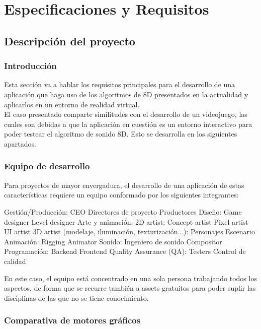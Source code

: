 \section{Especificaciones y Requisitos}

\subsection{Descripción del proyecto}
\subsubsection{Introducción}
\quad Esta sección va a hablar los requisitos principales para el desarrollo de una aplicación que haga uso de los algoritmos de 8D presentados en la actualidad y aplicarlos en un entorno de realidad virtual.\\

\quad El caso presentado comparte similitudes con el desarrollo de un videojuego, las cuales son debidas a que la aplicación en cuestión es un entorno interactivo para poder testear el algoritmo de sonido 8D. Esto se desarrolla en los siguientes apartados.

\subsubsection{Equipo de desarrollo}
\quad Para proyectos de mayor envergadura, el desarrollo de una aplicación de estas características requiere un equipo conformado por los siguientes integrantes:\\
\begin{outline}
\1 Gestión/Producción:
	\2 CEO
	\2 Directores de proyecto
	\2 Productores	
\1 Diseño:
	\2 Game designer
	\2 Level designer
\1 Arte y animación:
	\2 2D artist:
		\3 Concept artist
		\3 Pixel artist
		\3 UI artist
	\2 3D artist (modelaje, iluminación, texturización...):
		\3 Personajes
		\3 Escenario
\1 Animación:
	\2 Rigging
	\2 Animator
\1 Sonido:
	\2 Ingeniero de sonido
	\2 Compositor
\1 Programación:
	\2 Backend
	\2 Frontend
\1 Quality Assurance (QA):
	\2 Testers
	\2 Control de calidad
\end{outline}

\quad En este caso, el equipo está concentrado en una sola persona trabajando todos los aspectos, de forma que se recurre también a assets gratuitos para poder suplir las disciplinas de las que no se tiene conocimiento.\\

\subsubsection{Comparativa de motores gráficos}

